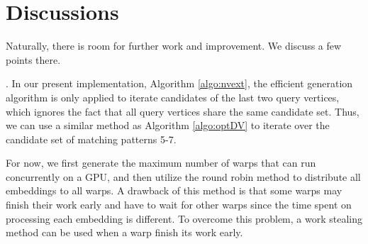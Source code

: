 \section{Discussions}
Naturally, there is room for further work and improvement. We discuss a few points there.

. In our present implementation, Algorithm \ref{algo:nvext}, the efficient generation algorithm is only applied to iterate candidates of the last two query vertices, which ignores the fact that all query vertices share the same candidate set. Thus, we can use a similar method as Algorithm \ref{algo:optDV} to iterate over the candidate set of matching patterns 5-7.

 For now, we first generate the maximum number of warps that can run concurrently on a GPU, and then utilize the round robin method to distribute all embeddings to all warps. A drawback of this method is that some warps may finish their work early and have to wait for other warps since the time spent on processing each embedding is different. To overcome this problem, a work stealing method can be used when a warp finish its work early.
